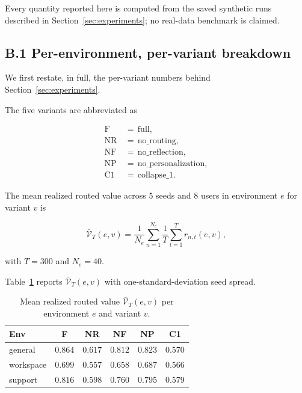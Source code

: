\documentclass{article} %
\begin{document}
Every quantity reported here is computed from the saved synthetic runs described in Section~\ref{sec:experiments}; no real-data benchmark is claimed.

\subsection{B.1 Per-environment, per-variant breakdown}

\label{app:per-variant}

We first restate, in full, the per-variant numbers behind Section~\ref{sec:experiments}.

The five variants are abbreviated as

\begin{equation}
\label{eq:app-variants}
\begin{aligned}
\mathrm{F} &\,=\, \mathrm{full},\\
\mathrm{NR} &\,=\, \mathrm{no\_routing},\\
\mathrm{NF} &\,=\, \mathrm{no\_reflection},\\
\mathrm{NP} &\,=\, \mathrm{no\_personalization},\\
\mathrm{C1} &\,=\, \mathrm{collapse\_1}.
\end{aligned}
\end{equation}

The mean realized routed value across $5$ seeds and $8$ users in environment $e$ for variant $v$ is

\begin{equation}
\label{eq:app-mean-reward-def}
\bar{\mathcal{V}}_T(e,v) = \frac{1}{N_e}\sum_{n=1}^{N_e}\frac{1}{T}\sum_{t=1}^{T}r_{n,t}(e,v),
\end{equation}

with $T=300$ and $N_e=40$.

Table~\ref{tab:app-mean-reward-sweeps} reports $\bar{\mathcal{V}}_T(e,v)$ with one-standard-deviation seed spread.

\begin{table}[h]
\centering
\small
\begin{tabular}{lccccc}
\toprule
Env & F & NR & NF & NP & C1 \\
\midrule
general    & $0.864$ & $0.617$ & $0.812$ & $0.823$ & $0.570$ \\
workspace  & $0.699$ & $0.557$ & $0.658$ & $0.687$ & $0.566$ \\
support    & $0.816$ & $0.598$ & $0.760$ & $0.795$ & $0.579$ \\
\bottomrule
\end{tabular}
\caption{Mean realized routed value $\bar{\mathcal{V}}_T(e,v)$ per environment $e$ and variant $v$.}
\label{tab:app-mean-reward-sweeps}
\end{table}
\end{document}
